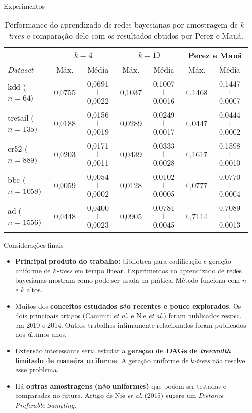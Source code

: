 \documentclass{beamer}
\begin{document}
\begin{frame}
\begin{columns}[t]
\begin{column}{0.5\textwidth}
\begin{block}{Experimentos}
\begin{table}
      {\small
        \begin{tabular}{l c c c c c c} \hline
          & \multicolumn{2}{c}{$k = 4$} & \multicolumn{2}{c}{$k = 10$} & \multicolumn{2}{c}{Perez e Mauá} \\ \hline
          \emph{Dataset} & Máx. & Média & Máx. & Média & Máx. & Média \\ \hline
          kdd ($n = 64$) & 0,0755 & 0,0691 $\pm$ 0,0022 & 0,1037 & 0,1007 $\pm$ 0,0016 & 0,1468 & 0,1447 $\pm$ 0,0007 \\
          tretail ($n = 135$) & 0,0188 & 0,0156 $\pm$ 0,0019 & 0,0289 & 0,0249 $\pm$ 0,0017 & 0,0447 & 0,0444 $\pm$ 0,0002 \\
          cr52 ($n = 889$) & 0,0203 & 0,0171 $\pm$ 0,0011 & 0,0439 & 0,0333 $\pm$ 0,0028 & 0,1617 & 0,1598 $\pm$ 0,0010 \\
          bbc ($n = 1058$) & 0,0059 & 0,0054 $\pm$ 0,0002 & 0,0128 & 0,0102 $\pm$ 0,0005 & 0,0777 & 0,0770 $\pm$ 0,0004 \\
          ad ($n = 1556$) & 0,0448 & 0,0400 $\pm$ 0,0023 & 0,0905 & 0,0781 $\pm$ 0,0045 & 0,7114 & 0,7089 $\pm$ 0,0013 \\ \hline
        \end{tabular}
      }

      \caption{Performance do aprendizado de redes bayesianas por amostragem de \emph{$k$-trees} e comparação dele com os resultados obtidos por Perez e Mauá.}
      \label{tab:comparacao}
    \end{table}
  \end{block}

  \begin{block}{Considerações finais}
    \begin{itemize}
      \item \textbf{Principal produto do trabalho:} biblioteca para codificação e geração uniforme de \emph{$k$-trees} em tempo linear. Experimentos no aprendizado de redes bayesianas mostram como pode ser usada na prática. Método funciona com $n$ e $k$ altos.
      \item Muitos dos \textbf{conceitos estudados são recentes e pouco explorados}. Os dois principais artigos (Caminiti \emph{et al.} e Nie \emph{et al.}) foram publicados respec. em 2010 e 2014. Outros trabalhos intimamente relacionados foram publicados nos últimos anos.
      \item Extensão interessante seria estudar a \textbf{geração de DAGs de \emph{treewidth} limitado de maneira uniforme}. A geração uniforme de \emph{$k$-trees} não resolve esse problema.
      \item Há \textbf{outras amostragens (não uniformes)} que podem ser testadas e comparadas no futuro. Artigo de Nie \emph{et al.} (2015) \cite{nie} sugere um \emph{Distance Preferable Sampling}.
    \end{itemize}
  \end{block}


\end{column}
\end{columns}
\end{frame}
\end{document}
